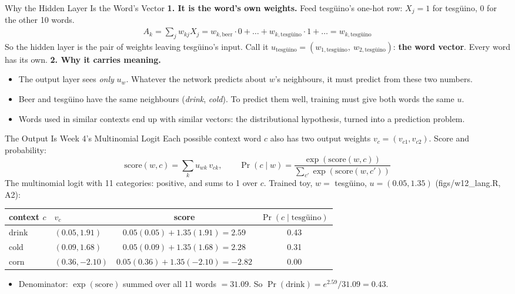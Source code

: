 \documentclass[aspectratio=169,11pt,xcolor=dvipsnames]{beamer}
\newcommand{\srcp}[1]{{\scriptsize\color{gray}(#1)}}
\begin{document}
\begin{frame}{Why the Hidden Layer Is the Word's Vector}
\textbf{1. It is the word's own weights.} Feed tesg\"uino's one-hot row: $X_j = 1$ for tesg\"uino, 0 for the other 10 words.
\begin{align*}
  A_k = \sum_{j} w_{kj} X_j = w_{k,\text{beer}} \cdot 0 + \dots + w_{k,\text{tesg\"uino}} \cdot 1 + \dots
   = w_{k,\text{tesg\"uino}}
\end{align*}
So the hidden layer is the pair of weights leaving tesg\"uino's input. Call it
$u_{\text{tesg\"uino}} = (w_{1,\text{tesg\"uino}},\ w_{2,\text{tesg\"uino}})$: \textbf{the word vector}. Every word has its own.
\vskip6pt
\textbf{2. Why it carries meaning.}
\begin{itemize}\itemsep3pt
  \item The output layer sees \emph{only} $u_w$. Whatever the network predicts about $w$'s neighbours,
        it must predict from these two numbers.
  \item Beer and tesg\"uino have the same neighbours (\emph{drink}, \emph{cold}). To predict them well,
        training must give both words the same $u$.
  \item Words used in similar contexts end up with similar vectors: the distributional hypothesis,
        turned into a prediction problem.
\end{itemize}
\end{frame}

\begin{frame}{The Output Is Week 4's Multinomial Logit}
Each possible context word $c$ also has two output weights $v_c = (v_{c1}, v_{c2})$. Score and probability:
\[
  \text{score}(w, c) = \sum_{k} u_{wk}\, v_{ck}, \qquad
  \Pr(c \mid w) = \frac{\exp(\text{score}(w, c))}{\sum_{c'} \exp(\text{score}(w, c'))}
\]
The multinomial logit with 11 categories: positive, and sums to 1 over $c$. Trained toy, $w =$ tesg\"uino,
$u = (0.05, 1.35)$ \srcp{figs/w12\_lang.R, A2}:
\begin{center}\small
\renewcommand{\arraystretch}{1.1}
\begin{tabular}{@{}llcc@{}}
\toprule
context $c$ & $v_c$ & score & $\Pr(c \mid \text{tesg\"uino})$ \\
\midrule
drink & $(0.05, 1.91)$ & $0.05(0.05) + 1.35(1.91) = 2.59$ & 0.43 \\
cold & $(0.09, 1.68)$ & $0.05(0.09) + 1.35(1.68) = 2.28$ & 0.31 \\
corn & $(0.36, -2.10)$ & $0.05(0.36) + 1.35(-2.10) = -2.82$ & 0.00 \\
\bottomrule
\end{tabular}
\end{center}
\begin{itemize}\itemsep2pt\small
  \item Denominator: $\exp(\text{score})$ summed over all 11 words $= 31.09$. So $\Pr(\text{drink}) = e^{2.59}/31.09 = 0.43$.
\end{itemize}
\end{frame}
\end{document}
